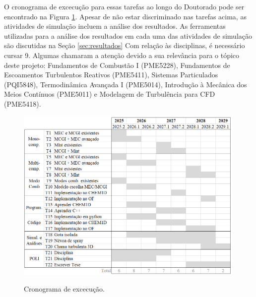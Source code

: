 O cronograma de excecução para essas tarefas ao longo do Doutorado pode ser encontrado na Figura \ref{fig:cronograma}.
Apesar de não estar discriminado nas tarefas acima, as atividades de simulação incluem a análise dos resultados. 
As ferramentas utilizadas para a análise dos resultados em cada uma das atividades de simulação são discutidas na Seção \ref{sec:resultados}
Com relação às disciplinas, é necessário cursar 9.
Algumas chamaram a atenção devido a sua relevância para o tópico deste projeto: Fundamentos de Combustão I (PME5228), Fundamentos de Escoamentos Turbulentos Reativos  (PME5411), Sistemas Particulados (PQI5848), Termodinâmica Avançada I (PME5014), Introdução à Mecânica dos Meios Contínuos (PME5011) e Modelagem de Turbulência para CFD (PME5418).

\begin{figure}[H]
    \centering
    \caption{Cronograma de excecução.}
    \includegraphics[width=0.99\textwidth]{30_images/cronograma-2.png}
    \label{fig:cronograma}
\end{figure}



